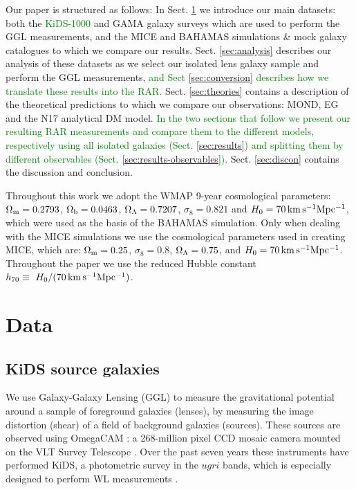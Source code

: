 \documentclass[usenatbib]{mnras}
\newcommand{\un}[1]{_{\rm #1}}
\begin{document}
Our paper is structured as follows: In Sect. \ref{sec:data} we introduce our main datasets: both the \textcolor{Green}{KiDS-1000} and GAMA galaxy surveys which are used to perform the GGL measurements, and the MICE and BAHAMAS simulations \& mock galaxy catalogues to which we compare our results. Sect. \ref{sec:analysis} describes our analysis of these datasets as we select our isolated lens galaxy sample and perform the GGL measurements, \textcolor{Green}{and Sect \ref{sec:conversion} describes how we translate these results into the RAR.} Sect. \ref{sec:theories} contains a description of the theoretical predictions to which we compare our observations: MOND, EG and the N17 analytical DM model. \textcolor{Green}{In the two sections that follow we present our resulting RAR measurements and compare them to the different models, respectively using all isolated galaxies (Sect. \ref{sec:results}) and splitting them by different observables (Sect. \ref{sec:results-observables}).} Sect. \ref{sec:discon} contains the discussion and conclusion.

Throughout this work we adopt the WMAP 9-year \cite[]{hinshaw2013} cosmological parameters: $\Omega\un{m}=0.2793$, $\Omega\un{b}=0.0463$, $\Omega\un{\Lambda}=0.7207$, $\sigma_8=0.821$ and $H_0 = 70 \, {\rm km \, s^{-1} Mpc^{-1}}$, which were used as the basis of the BAHAMAS simulation. Only when dealing with the MICE simulations we use the cosmological parameters used in creating MICE, which are: $\Omega\un{m}=0.25$, $\sigma_8=0.8$, $\Omega\un{\Lambda}=0.75$, and $H_0 = 70 \, {\rm km \, s^{-1} Mpc^{-1}}$. Throughout the paper we use the reduced Hubble constant $h_{70} \equiv \ H_0 / (70 \, {\rm km \, s^{-1} Mpc^{-1}})$.

\section{Data}
\label{sec:data}

\subsection{KiDS source galaxies}
\label{sec:kids}

We use Galaxy-Galaxy Lensing (GGL) to measure the gravitational potential around a sample of foreground galaxies (lenses), by measuring the image distortion (shear) of a field of background galaxies (sources). These sources are observed using OmegaCAM \cite[]{kuijken2011}: a 268-million pixel CCD mosaic
camera mounted on the VLT Survey Telescope \cite[]{capaccioli2011}. Over the past seven years these instruments have performed KiDS, a photometric survey in the $ugri$ bands, which is especially designed to perform WL measurements \cite[]{dejong2013}.
\end{document}
